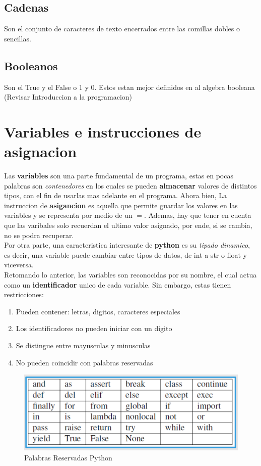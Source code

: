 \documentclass{article}
\begin{document}
\subsection{Cadenas}
Son el conjunto de caracteres de texto encerrados entre las comillas dobles o sencillas.
\subsection{Booleanos}
Son el True y el False o 1 y 0. Estos estan mejor definidos en al algebra booleana (Revisar Introduccion a la programacion)
\section{Variables e instrucciones de asignacion}
Las \textbf{variables} son una parte fundamental de un programa, estas en pocas palabras son \textit{contenedores} en los cuales se pueden \textbf{almacenar} valores de distintos tipos, con el fin de usarlas mas adelante en el programa. Ahora bien, La instruccion de \textbf{asigancion} es aquella que permite guardar los valores en las variables y se representa por medio de un \(=\). Ademas, hay que tener en cuenta que las varibales solo recuerdan el ultimo valor asignado, por ende, si se cambia, no se podra recuperar. \\
Por otra parte, una caracteristica interesante de \textbf{python} es su \textit{tipado dinamico}, es decir, una variable puede cambiar entre tipos de datos, de int a str o float y viceversa.\\
Retomando lo anterior, las variables son reconocidas por su nombre, el cual actua como un \textbf{identificador} unico de cada variable. Sin embargo, estas tienen restricciones: 
\begin{enumerate}
    \item Pueden contener: letras, digitos, caracteres especiales
    \item Los identificadores no pueden iniciar con un digito
    \item Se distingue entre mayusculas y minusculas
    \item No pueden coincidir con palabras reservadas
\end{enumerate}
\begin{figure}[H]
    \centering
    \includegraphics[width=1\linewidth]{PalabrasReservadas.png}
    \caption{Palabras Reservadas Python}
    \label{fig:enter-label}
\end{figure}
\end{document}
